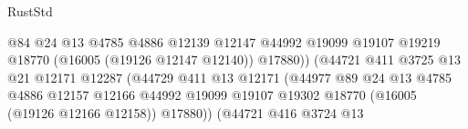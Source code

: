 \begin{lexlean}{RustStd}
\begin{coremodule}
                                                    @84
                                                    @24
                                                    @13
                                                    @4785
                                                    @4886
                                                    @12139
                                                    @12147
                                                    @44992
                                                    @19099
                                                    @19107
                                                    @19219
                                                    @18770
                                                    (@16005 (@19126 @12147 @12140))
                                                    @17880))
                                                (@44721
                                                  @411
                                                  @3725
                                                  @13
                                                  @21
                                                  @12171
                                                  @12287
                                                  (@44729
                                                    @411
                                                    @13
                                                    @12171
                                                    (@44977
                                                      @89
                                                      @24
                                                      @13
                                                      @4785
                                                      @4886
                                                      @12157
                                                      @12166
                                                      @44992
                                                      @19099
                                                      @19107
                                                      @19302
                                                      @18770
                                                      (@16005 (@19126 @12166 @12158))
                                                      @17880))
                                                  (@44721
                                                    @416
                                                    @3724
                                                    @13

\end{coremodule}
\end{lexlean}
